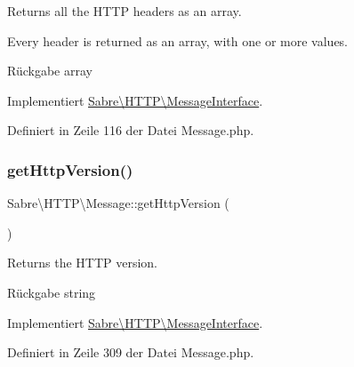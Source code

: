 Returns all the H\+T\+TP headers as an array.

Every header is returned as an array, with one or more values.

\begin{DoxyReturn}{Rückgabe}
array 
\end{DoxyReturn}


Implementiert \mbox{\hyperlink{interface_sabre_1_1_h_t_t_p_1_1_message_interface_af4af3d2f6712193eec05494ad2b014ab}{Sabre\textbackslash{}\+H\+T\+T\+P\textbackslash{}\+Message\+Interface}}.



Definiert in Zeile 116 der Datei Message.\+php.

\mbox{\label{class_sabre_1_1_h_t_t_p_1_1_message_a690263e84e9503548b5ed73e0518433a}} 
\subsubsection{\texorpdfstring{get\+Http\+Version()}{getHttpVersion()}}
{\footnotesize\ttfamily Sabre\textbackslash{}\+H\+T\+T\+P\textbackslash{}\+Message\+::get\+Http\+Version (\begin{DoxyParamCaption}{ }\end{DoxyParamCaption})}

Returns the H\+T\+TP version.

\begin{DoxyReturn}{Rückgabe}
string 
\end{DoxyReturn}


Implementiert \mbox{\hyperlink{interface_sabre_1_1_h_t_t_p_1_1_message_interface_a0dd9057fca16d4947ecdbe6bc425caff}{Sabre\textbackslash{}\+H\+T\+T\+P\textbackslash{}\+Message\+Interface}}.



Definiert in Zeile 309 der Datei Message.\+php.

\mbox{\label{class_sabre_1_1_h_t_t_p_1_1_message_abcaf141342d71f887630dac0a6eca95a}} 
